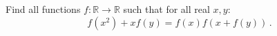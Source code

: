 Find all functions $f : \mathbb{R} \to \mathbb{R}$ such that for all real $x,y$:$$ f(x^2) + xf(y) = f(x) f(x + f(y)) \, . $$